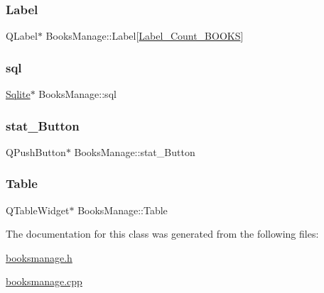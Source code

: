 \subsubsection{\texorpdfstring{Label}{Label}}
{\footnotesize\ttfamily Q\+Label$\ast$ Books\+Manage\+::\+Label\mbox{[}\mbox{\hyperlink{booksmanage_8h_a575ef603f6be7bd11518983b660df624}{Label\+\_\+\+Count\+\_\+\+B\+O\+O\+KS}}\mbox{]}\hspace{0.3cm}{\ttfamily [private]}}

\mbox{\label{class_books_manage_a081e78f1eccbf607c3874a6c8c714983}} 
\subsubsection{\texorpdfstring{sql}{sql}}
{\footnotesize\ttfamily \mbox{\hyperlink{class_sqlite}{Sqlite}}$\ast$ Books\+Manage\+::sql\hspace{0.3cm}{\ttfamily [private]}}

\mbox{\label{class_books_manage_ab20d4d4f5d41c878f839c313764d66a5}} 
\subsubsection{\texorpdfstring{stat\_Button}{stat\_Button}}
{\footnotesize\ttfamily Q\+Push\+Button$\ast$ Books\+Manage\+::stat\+\_\+\+Button\hspace{0.3cm}{\ttfamily [private]}}

\mbox{\label{class_books_manage_a0c82c7e6c92bc699d5f59af1e8a81d7a}} 
\subsubsection{\texorpdfstring{Table}{Table}}
{\footnotesize\ttfamily Q\+Table\+Widget$\ast$ Books\+Manage\+::\+Table\hspace{0.3cm}{\ttfamily [private]}}



The documentation for this class was generated from the following files\+:\begin{DoxyCompactItemize}
\item 
\mbox{\hyperlink{booksmanage_8h}{booksmanage.\+h}}\item 
\mbox{\hyperlink{booksmanage_8cpp}{booksmanage.\+cpp}}\end{DoxyCompactItemize}
